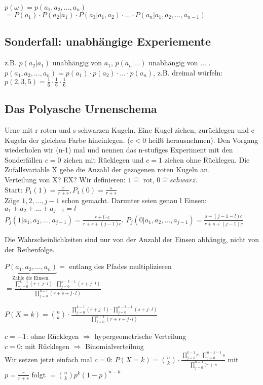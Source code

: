 $p(\omega) = p(a_1, a_2, ..., a_n)$ 
$= P(a_1) \cdot P(a_2 | a_1) \cdot P(a_3 | a_1,a_2) \cdot ... \cdot P(a_n | a_1,a_2,...,a_{n-1})$

\subsection{Sonderfall: unabhängige Experiemente}
z.B. $p(a_2|a_1)$ unabhängig von $a_1$, $p(a_n | ... )$ unabhängig von ... .
$p(a_1,a_2,...,a_n) = p(a_1) \cdot p(a_2) \cdot ... \cdot p(a_n)$, z.B. dreimal würfeln: 
$p(2,3,5) = \frac{1}{6} \cdot \frac{1}{6} \cdot \frac{1}{6}$

\subsection{Das Polyasche Urnenschema}
Urne mit r roten und s schwarzen Kugeln. Eine Kugel ziehen, zurücklegen und c Kugeln der gleichen Farbe hineinlegen. ($c<0$ heißt herausnehmen). Den Vorgang wiederholen wir (n-1) mal und nennen das n-stufiges Experiment mit den Sonderfällen $c=0$ ziehen mit Rücklegen und $c=1$ ziehen ohne Rücklegen. Die Zufallsvariable X gebe die Anzahl der gezogenen roten Kugeln an. \\

Verteilung von X? EX? Wir definieren: $ 1 \widehat{=}$ rot, $0 \widehat{=} schwarz$.\\
Start: $P_1(1) = \frac{r}{r+s}, P_1(0) = \frac{s}{r+s}$\\
Züge $1, 2, ..., j-1$ schon gemacht. Darunter seien genau l Einsen: $ a_1 + a_2 + ... + a_{j-1} = l$\\
$P_j(1|a_1,a_2,...,a_{j-1}) = \frac{r + l \cdot c}{r+s+(j-1)c}$, 
$P_j(0|a_1,a_2,...,a_{j-1}) = \frac{s + (j-1-l)c}{r+s+(j-1)c}$

Die Wahrscheinlichkeiten sind nur von der Anzahl der Einsen abhängig, nicht von der Reihenfolge.

$\underbrace{P(a_1, a_2, ..., a_n)}_{\textrm{Zähle die Einsen.}} =$ entlang des Pfades multiplizieren 
$= \frac{\prod_{j=0}^{k-1} (r+j \cdot l ) \cdot \prod_{j=0}^{n-k-1} (s+j \cdot l)}{\prod_{j=0}^{n-1} (r+s+j\cdot l)}$

$P(X=k) = \binom n k \cdot \frac{\prod_{j=0}^{k-1} (r+j \cdot l ) \cdot \prod_{j=0}^{n-k-1} (s+j \cdot l)}{\prod_{j=0}^{n-1} (r+s+j\cdot l)}$

$c=-1$: ohne Rücklegen $\Rightarrow$ hypergeometrische Verteilung\\
$c=0$: mit Rücklegen $\Rightarrow$ Binomialverteilung\\

Wir setzen jetzt einfach mal $c=0$: 
$P(X=k) = \binom n k \cdot \frac{\prod_{j=0}^{k-1} r \cdot \prod_{j=0}^{n-k-1} s}{\prod_{j=0}^{n-1} (r+s}$
mit $p=\frac{r}{r+s}$ folgt 
$= \binom n k p^k (1-p)^{n-k}$